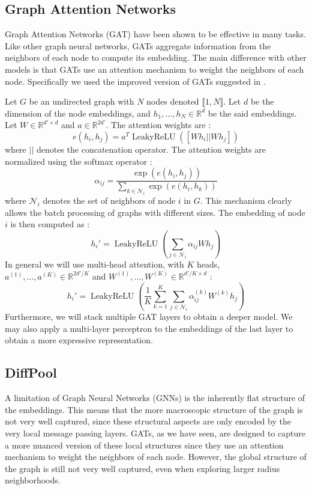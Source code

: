 \documentclass[switch, 12pt]{article}
\DeclareMathOperator{\leakyrelu}{LeakyReLU}
\newcommand{\R}{\mathbb{R}}
\begin{document}
\begin{multicols}{2}
    \subsection{Graph Attention Networks}

    Graph Attention Networks (GAT) \cite{velickovic-2018} have been shown to be effective in many tasks. Like other graph neural networks, GATs aggregate information from the neighbors of each node to compute its embedding. The main difference with other models is that GATs use an attention mechanism to weight the neighbors of each node. Specifically we used the improved version of GATs suggested in \cite{brody-2021}.

    Let $G$ be an undirected graph with $N$ nodes denoted $\llbracket1, N\rrbracket$. Let $d$ be the dimension of the node embeddings, and $h_1,\dots,h_N\in\R^d$ be the said embeddings. Let $W\in\R^{d'\times d}$ and $a\in\R^{2d'}$. The attention weights are :
    \begin{equation}
        e(h_i,h_j) = a^T \leakyrelu([Wh_i || Wh_j])
    \end{equation}
    where $||$ denotes the concatenation operator. The attention weights are normalized using the softmax operator :
    \begin{equation}
        \alpha_{ij} = \frac{\exp(e(h_i,h_j))}{\sum_{k\in\mathcal{N}_i}\exp(e(h_i,h_k))}
    \end{equation}
    where $\mathcal{N}_i$ denotes the set of neighbors of node $i$ in $G$. This mechanism clearly allows the batch processing of graphs with different sizes. The embedding of node $i$ is then computed as :
    \begin{equation}
        h_i' = \leakyrelu\left(\sum_{j\in\mathcal{N}_i}\alpha_{ij}Wh_j\right)
    \end{equation}
    In general we will use multi-head attention, with $K$ heads, $a^{(1)},\dots,a^{(K)}\in\R^{2d'/K}$ and $W^{(1)},\dots,W^{(K)}\in\R^{d'/K\times d}$ :
    \begin{equation}
        h_i' = \leakyrelu\left(\frac{1}{K}\sum_{k=1}^K\sum_{j\in\mathcal{N}_i}\alpha_{ij}^{(k)}W^{(k)}h_j\right)
    \end{equation}
    Furthermore, we will stack multiple GAT layers to obtain a deeper model. We may also apply a multi-layer perceptron to the embeddings of the last layer to obtain a more expressive representation.


    \subsection{DiffPool}
    A limitation of Graph Neural Networks (GNNs) is the inherently flat structure of the embeddings. This means that the more macroscopic structure of the graph is not very well captured, since these structural aspects are only encoded by the very local message passing layers. GATs, as we have seen, are designed to capture a more nuanced version of these local structures since they use an attention mechanism to weight the neighbors of each node. However, the global structure of the graph is still not very well captured, even when exploring larger radius neighborhoods.


\end{multicols}
\end{document}
